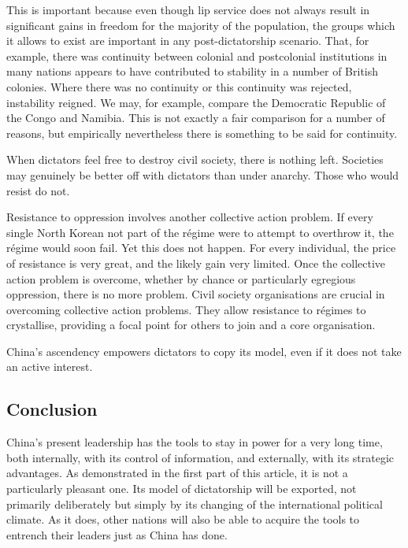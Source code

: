 	This is important because even though lip service does not always result
	in significant gains in freedom for the majority of the population, the
	groups which it allows to exist are important in any post-dictatorship
	scenario. That, for example, there was continuity between colonial and
	postcolonial institutions in many nations appears to have contributed to
	stability in a number of British colonies. Where there was no continuity
	or this continuity was rejected, instability reigned. We may, for
	example, compare the Democratic Republic of the Congo and Namibia. This
	is not exactly a fair comparison for a number of reasons, but
	empirically nevertheless there is something to be said for continuity.

	When dictators feel free to destroy civil society, there is nothing
	left. Societies may genuinely be better off with dictators than under
	anarchy. Those who would resist do not.

	Resistance to oppression involves another collective action problem. If
	every single North Korean not part of the régime were to attempt to
	overthrow it, the régime would soon fail. Yet this does not happen. For
	every individual, the price of resistance is very great, and the likely
	gain very limited. Once the collective action problem is overcome,
	whether by chance or particularly egregious oppression, there is no more
	problem. Civil society organisations are crucial in overcoming
	collective action problems. They allow resistance to régimes to
	crystallise, providing a focal point for others to join and a core
	organisation.

	China's ascendency empowers dictators to copy its model, even if it does
	not take an active interest.


\subsection{Conclusion}\label{conclusion}


	China's present leadership has the tools to stay in power for a very
	long time, both internally, with its control of information, and
	externally, with its strategic advantages. As demonstrated in the first
	part of this article, it is not a particularly pleasant one. Its model
	of dictatorship will be exported, not primarily deliberately but simply
	by its changing of the international political climate. As it does,
	other nations will also be able to acquire the tools to entrench their
	leaders just as China has done.
